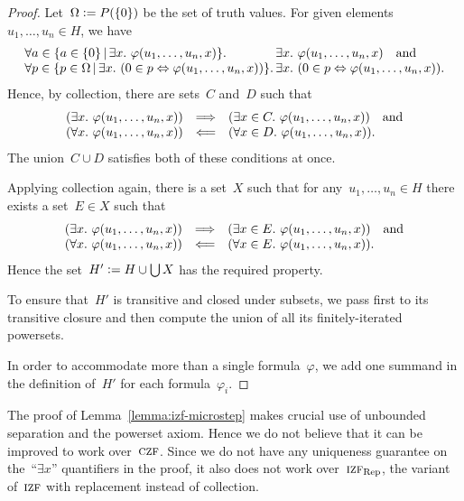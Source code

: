 \documentclass[oneside,reqno]{amsart}
\theoremstyle{definition}
\theoremstyle{plain}
\theoremstyle{remark}
\newcommand{\defeq}{\vcentcolon=}
\renewcommand{\_}{\mathpunct{.}\,}
\newcommand{\?}{\,{:}\,}
\newcommand{\IZF}{\textsc{izf}}
\newcommand{\CZF}{\textsc{czf}}
\begin{document}
\begin{proof}Let~$\Omega \defeq P(\{0\})$ be the set of truth values.
For given elements~$u_1,\ldots,u_n \in H$, we have
\[ \begin{array}{@{}l@{}l@{}}
  \forall a \in \{ a \in \{0\} \,|\, \exists x\_ \varphi(u_1,\ldots,u_n,x) \}\_ &
  \exists x\_ \varphi(u_1,\ldots,u_n,x) \quad\text{and} \\
  \forall p \in \{ p \in \Omega \,|\, \exists x\_ (0 \in p \Leftrightarrow
  \varphi(u_1,\ldots,u_n,x)) \}\_ &
  \exists x\_ (0 \in p \Leftrightarrow \varphi(u_1,\ldots,u_n,x)).
\end{array} \]
Hence, by collection, there are sets~$C$ and~$D$ such that
\[ \begin{array}{@{}rcl@{}}
  (\exists x\_ \varphi(u_1,\ldots,u_n,x)) &\Longrightarrow&
  (\exists x \in C\_ \varphi(u_1,\ldots,u_n,x)) \quad\text{and} \\
  (\forall x\_ \varphi(u_1,\ldots,u_n,x)) &\Longleftarrow&
  (\forall x \in D\_ \varphi(u_1,\ldots,u_n,x)).
\end{array} \]
The union~$C \cup D$ satisfies both of these conditions at once.

Applying collection again, there is a set~$X$ such that for
any~$u_1,\ldots,u_n \in H$ there exists a set~$E \in X$ such that
\[ \begin{array}{@{}rcl@{}}
  (\exists x\_ \varphi(u_1,\ldots,u_n,x)) &\Longrightarrow&
  (\exists x \in E\_ \varphi(u_1,\ldots,u_n,x)) \quad\text{and} \\
  (\forall x\_ \varphi(u_1,\ldots,u_n,x)) &\Longleftarrow&
  (\forall x \in E\_ \varphi(u_1,\ldots,u_n,x)).
\end{array} \]
Hence the set~$H' \defeq H \cup \bigcup X$ has the required property.

To ensure that~$H'$ is transitive and closed under subsets, we pass
first to its transitive closure and then compute the union of all its
finitely-iterated powersets.

In order to accommodate more than a single formula~$\varphi$, we add one summand
in the definition of~$H'$ for each formula~$\varphi_i$.
\end{proof}

The proof of Lemma~\ref{lemma:izf-microstep} makes crucial use of unbounded
separation and the powerset axiom. Hence we do not believe that it can
be improved to work over~$\CZF$. Since we do not have any uniqueness guarantee
on the~``$\exists x$'' quantifiers in the proof, it also does not work
over~$\IZF_\text{Rep}$, the variant of~$\IZF$ with replacement instead of
collection.
\end{document}
